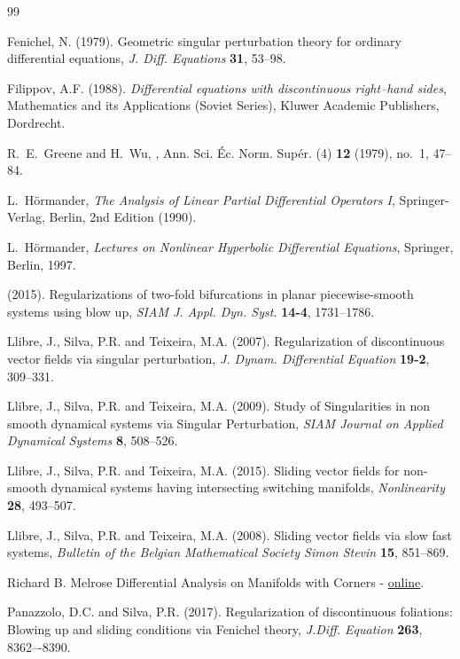 \documentclass[11pt,psamsfonts]{article}
\theoremstyle{definition}
\theoremstyle{remark}
\begin{document}
\begin{thebibliography}{99}
 
  {Fenichel, N.} (1979).
Geometric singular perturbation theory for ordinary differential equations,
\textit{J. Diff. Equations} \textbf{31}, 53--98.

 {Filippov, A.F.} (1988).
\emph{Differential equations with discontinuous right--hand sides},
Mathematics and its Applications (Soviet Series), Kluwer Academic
Publishers, Dordrecht.

R.~E.~Greene and H.~Wu,
,
\newblock Ann. Sci. \'Ec. Norm. Sup\'er. (4) \textbf{12} (1979), no.~1, 47--84.

L.~H{\"o}rmander,
\emph{The Analysis of Linear Partial Differential Operators I},
Springer-Verlag, Berlin, 2nd Edition (1990).

L.~H{\"o}rmander,
\emph{Lectures on Nonlinear Hyperbolic Differential Equations},
Springer, Berlin, 1997.

 (2015).
Regularizations of two-fold bifurcations in planar piecewise-smooth systems using blow up,
\textit{SIAM J. Appl. Dyn. Syst.} \textbf{14-4}, 1731--1786.


 {Llibre, J., Silva, P.R. and Teixeira, M.A.} (2007).
Regularization of discontinuous vector fields via singular
perturbation, \textit{J. Dynam. Differential Equation} \textbf{19-2}, 309--331.

 {Llibre, J., Silva, P.R. and Teixeira, M.A.} (2009).
Study of Singularities in non smooth dynamical systems via Singular Perturbation, 
\emph{SIAM Journal on Applied Dynamical Systems} \textbf{8},  508--526.

 {Llibre, J., Silva, P.R. and Teixeira, M.A.} (2015). Sliding vector fields for non-smooth 
dynamical systems having intersecting switching manifolds, \emph{Nonlinearity} \textbf{28}, 493--507.

 {Llibre, J., Silva, P.R. and Teixeira, M.A.} (2008).
Sliding vector fields via slow fast systems, \textit{Bulletin of the
Belgian Mathematical Society Simon Stevin} \textbf{15}, 851--869.

 {Richard B. Melrose} Differential Analysis on Manifolds with Corners - \href{https://math.mit.edu/~rbm/book.html}{online}.

 {Panazzolo, D.C. and  Silva, P.R.} (2017).
Regularization of discontinuous foliations: Blowing up
and sliding conditions via Fenichel theory, \textit{J.Diff. Equation} \textbf{263},
8362–-8390.


\end{thebibliography}
\end{document}
